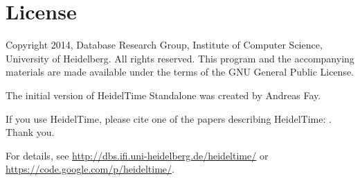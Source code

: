 \documentclass[
     11pt,         %
     a4paper,      %
     oneside,
     ]{article}
\newcommand{\product}{HeidelTime Standalone}
\begin{document}
\section{License}
Copyright \textcopyright{} 2014, Database Research Group, Institute of Computer Science, University of Heidelberg. 
All rights reserved. This program and the accompanying materials are made available under the terms of the GNU General Public License.

The initial version of \product{} was created by Andreas Fay.

If you use HeidelTime, please cite one of the papers describing HeidelTime: \cite{StroetgenGertz2010_SemEval, StroetgenGertz2013_LRE}. Thank you.

For details, see \url{http://dbs.ifi.uni-heidelberg.de/heideltime/} or \\
\url{https://code.google.com/p/heideltime/}.



\newpage



\newpage

\end{document}
